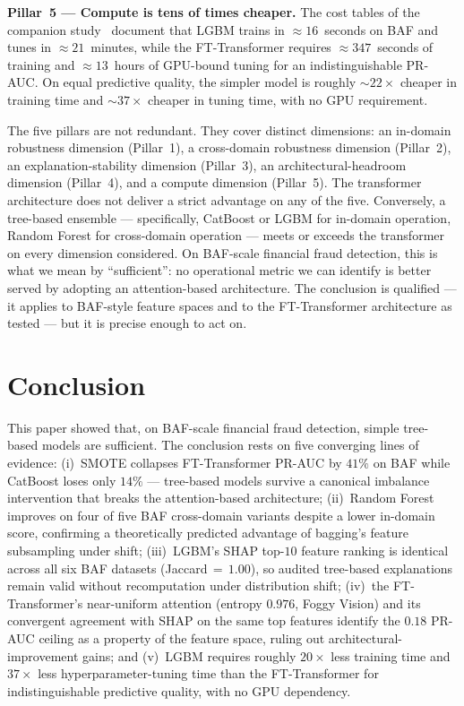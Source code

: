 \documentclass[a4paper,fleqn]{cas-sc}
\begin{document}
\textbf{Pillar~5 --- Compute is tens of times cheaper.}
The cost tables of the companion study~\citep{caixeiro2025threshold} document
that LGBM trains in $\approx 16$~seconds on BAF and tunes in $\approx 21$~minutes,
while the FT-Transformer requires $\approx 347$~seconds of training and
$\approx 13$~hours of GPU-bound tuning for an indistinguishable PR-AUC.
On equal predictive quality, the simpler model is roughly $\sim 22\times$
cheaper in training time and $\sim 37\times$ cheaper in tuning time, with no
GPU requirement.

The five pillars are not redundant.
They cover distinct dimensions: an in-domain robustness dimension (Pillar~1),
a cross-domain robustness dimension (Pillar~2), an explanation-stability
dimension (Pillar~3), an architectural-headroom dimension (Pillar~4), and a
compute dimension (Pillar~5).
The transformer architecture does not deliver a strict advantage on any of
the five.
Conversely, a tree-based ensemble --- specifically, CatBoost or LGBM for in-domain
operation, Random Forest for cross-domain operation --- meets or exceeds the
transformer on every dimension considered.
On BAF-scale financial fraud detection, this is what we mean by ``sufficient'':
no operational metric we can identify is better served by adopting an
attention-based architecture.
The conclusion is qualified --- it applies to BAF-style feature spaces and to
the FT-Transformer architecture as tested --- but it is precise enough to act
on.


\section{Conclusion}
\label{sec:conclusion}

This paper showed that, on BAF-scale financial fraud detection, simple
tree-based models are sufficient.
The conclusion rests on five converging lines of evidence: (i)~SMOTE collapses
FT-Transformer PR-AUC by $41\%$ on BAF while CatBoost loses only $14\%$ ---
tree-based models survive a canonical imbalance intervention that breaks the
attention-based architecture; (ii)~Random Forest improves on four of five BAF
cross-domain variants despite a lower in-domain score, confirming a
theoretically predicted advantage of bagging's feature subsampling under shift;
(iii)~LGBM's SHAP top-$10$ feature ranking is identical across all six BAF
datasets (Jaccard\,$=\,1.00$), so audited tree-based explanations remain valid
without recomputation under distribution shift; (iv)~the FT-Transformer's
near-uniform attention (entropy $0.976$, Foggy Vision) and its convergent
agreement with SHAP on the same top features identify the $0.18$ PR-AUC ceiling
as a property of the feature space, ruling out architectural-improvement
gains; and (v)~LGBM requires roughly $20\times$ less training time and
$37\times$ less hyperparameter-tuning time than the FT-Transformer for
indistinguishable predictive quality, with no GPU dependency.
\end{document}
